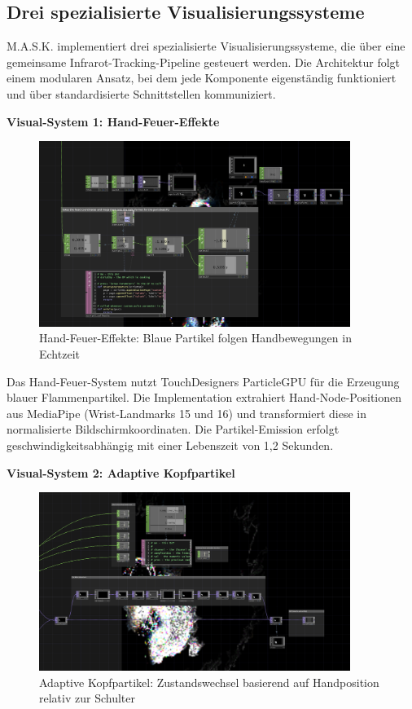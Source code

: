 \subsection{Drei spezialisierte Visualisierungssysteme}

M.A.S.K. implementiert drei spezialisierte Visualisierungssysteme, die über eine gemeinsame Infrarot-Tracking-Pipeline gesteuert werden. Die Architektur folgt einem modularen Ansatz, bei dem jede Komponente eigenständig funktioniert und über standardisierte Schnittstellen kommuniziert.

\textbf{Visual-System 1: Hand-Feuer-Effekte}

\begin{figure}[h]
    \centering
    \includegraphics[width=0.9\textwidth]{images/docupictures/NoisyBlob_HEAD_to_ParticleGPU_Translate.png}
    \caption{Hand-Feuer-Effekte: Blaue Partikel folgen Handbewegungen in Echtzeit}
    \label{fig:particle_hands}
\end{figure}

Das Hand-Feuer-System nutzt TouchDesigners ParticleGPU für die Erzeugung blauer Flammenpartikel. Die Implementation extrahiert Hand-Node-Positionen aus MediaPipe (Wrist-Landmarks 15 und 16) und transformiert diese in normalisierte Bildschirmkoordinaten. Die Partikel-Emission erfolgt geschwindigkeitsabhängig mit einer Lebenszeit von 1,2 Sekunden.

\textbf{Visual-System 2: Adaptive Kopfpartikel}

\begin{figure}[h]
    \centering
    \includegraphics[width=0.9\textwidth]{images/docupictures/NoisyBlob_animatedSwitchzwischenBlitzUndNichtBlitzBeiTrackingTrigger.png}
    \caption{Adaptive Kopfpartikel: Zustandswechsel basierend auf Handposition relativ zur Schulter}
    \label{fig:relative_switch}
\end{figure}

